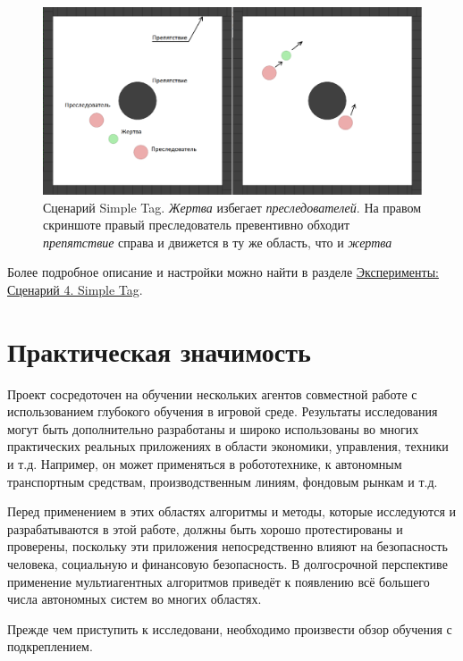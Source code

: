 \begin{figure}[ht!]
    \center
    \includegraphics [scale=0.41] {my_folder/images/intro/st.png}
    \caption{Сценарий Simple Tag. \textit{Жертва} избегает \textit{преследователей}. На правом скриншоте правый преследователь превентивно обходит \textit{препятствие} справа и движется в ту же область, что и \textit{жертва}}
    \label{fig:st}
\end{figure}

Более подробное описание и настройки можно найти в разделе \hyperref[exp-st]{Эксперименты: Сценарий 4. Simple Tag}.


\section{Практическая значимость} \label{intro:sec3}

Проект сосредоточен на обучении нескольких агентов совместной работе с использованием глубокого обучения в игровой среде. Результаты исследования могут быть дополнительно разработаны и широко использованы во многих практических реальных приложениях в области экономики, управления, техники и т.д. Например, он может применяться в робототехнике, к автономным транспортным средствам, производственным линиям, фондовым рынкам и т.д.

Перед применением в этих областях алгоритмы и методы, которые исследуются и разрабатываются в этой работе, должны быть хорошо протестированы и проверены, поскольку эти приложения непосредственно влияют на безопасность человека, социальную и финансовую безопасность. В долгосрочной перспективе применение мультиагентных алгоритмов приведёт к появлению всё большего числа автономных систем во многих областях.

Прежде чем приступить к исследовани, необходимо произвести обзор обучения с подкреплением.


